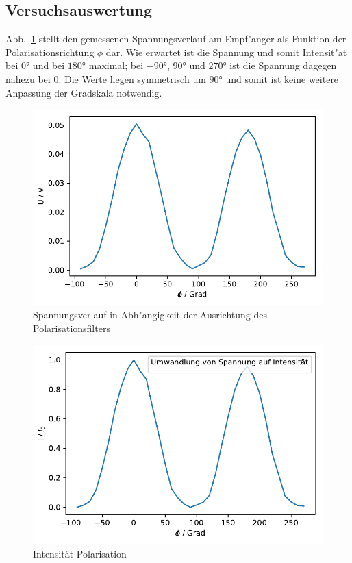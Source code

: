 \documentclass[12pt,a4paper]{article}
\begin{document}
\subsection{Versuchsauswertung}
Abb.~\ref{Polarisation_Rohdaten} stellt den gemessenen Spannungsverlauf am Empf"anger als Funktion der Polarisationsrichtung $\phi$ dar. Wie erwartet ist die Spannung und somit Intensit"at bei $\ang{0}$ und bei $\ang{180}$ maximal; bei $\ang{-90}$, $\ang{90}$ und $\ang{270}$ ist die Spannung dagegen nahezu bei 0. Die Werte liegen symmetrisch um $\ang{90}$ und somit ist keine weitere Anpassung der Gradskala notwendig.
\begin{figure}
\centering
\includegraphics[scale=1]{Bilder/Polarisation_Rohdaten.pdf}
\caption{Spannungsverlauf in Abh"angigkeit der Ausrichtung des Polarisationsfilters}
\label{Polarisation_Rohdaten}
\end{figure}
\begin{figure}
	\centering
	\includegraphics[scale=1]{Bilder/Polarisation_Intensitaet.pdf}
	\caption{Intensität Polarisation}
	\label{Polarisation_Intensitaet}
\end{figure}
\end{document}
